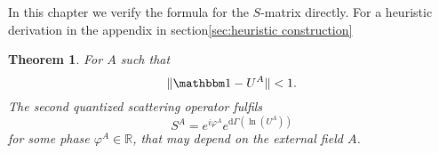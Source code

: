 \documentclass[b5paper,draft,openbib,12pt]{memoir}
\newtheorem{Thm}[Def]{Theorem}
\newcommand{\id}{{\mathbbm 1}}
\begin{document}
In this chapter we verify the formula for the \(S\)-matrix directly.
For a heuristic derivation in the appendix in section\ref{sec:heuristic construction}


\begin{Thm}\label{sleek_second_quantised_scattering_operator}
For \(A\) such that 
\begin{equation}
\|\id-U^A\|<1.
\end{equation}\label{eq:sleek_scattering}
The second quantized scattering operator fulfils
\begin{equation}\label{eq:sleek_second_quantised_scattering_operator}
S^A= e^{i \varphi^A} e^{\mathrm{d}\Gamma(\ln (U^A))}
\end{equation}
for some phase \(\varphi^A\in\mathbb{R}\), that may depend on the external field \(A\).

\end{Thm}
\end{document}
